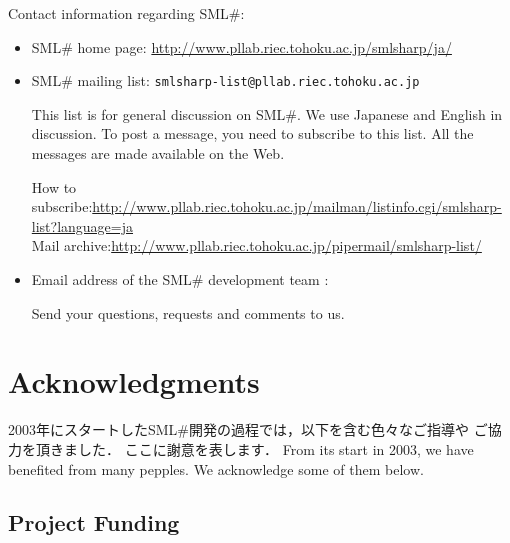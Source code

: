 \documentclass{jbook}
\newcommand{\txt}[2]{#2}
\newcommand{\smlsharp}{SML\#}
\begin{document}
	Contact information regarding \smlsharp{}:
\begin{itemize}
\item \smlsharp{} home page:
\url{http://www.pllab.riec.tohoku.ac.jp/smlsharp/ja/}

\item \smlsharp{} mailing list:
{\tt smlsharp-list@pllab.riec.tohoku.ac.jp}

This list is for general discussion on \smlsharp{}.
We use Japanese and English in discussion.
To post a message, you need to subscribe to this list.
All the messages are made available on the Web.

How to subscribe:\url{http://www.pllab.riec.tohoku.ac.jp/mailman/listinfo.cgi/smlsharp-list?language=ja}\\
Mail archive:\url{http://www.pllab.riec.tohoku.ac.jp/pipermail/smlsharp-list/}

\item Email address of the \smlsharp{} development team :

Send your questions, requests and comments to us.
\end{itemize}
\fi%

\section{\txt{謝辞}{Acknowledgments}}
\label{sec:acknowledgements}
	
\ifx\jp%
	2003年にスタートしたSML#開発の過程では，以下を含む色々なご指導や
ご協力を頂きました．
	ここに謝意を表します．
\else%
	From its start in 2003, we have benefited from many pepples.
	We acknowledge some of them below.
\fi%
	
\subsection{\txt{プロジェクトファンディング}{Project Funding}}
\end{document}

